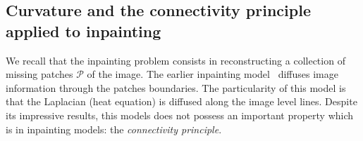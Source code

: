 \subsection{Curvature and the connectivity principle applied to inpainting}

We recall that the inpainting problem consists in reconstructing a collection of missing patches $\mathcal{P}$ of the image. The earlier inpainting model~\cite{bertalmio00image}  diffuses image information through the patches boundaries. The particularity of this model is that the Laplacian (heat equation) is diffused along the image level lines. Despite its impressive results, this models does not possess an important property which is  in inpainting models: the \emph{connectivity principle}.


\begin{figure}
\center
{}\hspace{3em}
\end{figure}
